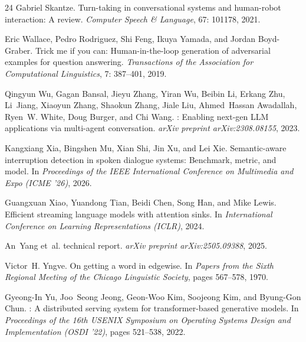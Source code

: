 \documentclass{article}
\begin{document}
\begin{thebibliography}{24}
Gabriel Skantze.
\newblock Turn-taking in conversational systems and human-robot interaction: A review.
\newblock \emph{Computer Speech \& Language}, 67: 101178, 2021.

Eric Wallace, Pedro Rodriguez, Shi Feng, Ikuya Yamada, and Jordan Boyd-Graber.
\newblock Trick me if you can: Human-in-the-loop generation of adversarial examples for question answering.
\newblock \emph{Transactions of the Association for Computational Linguistics}, 7: 387--401, 2019.

Qingyun Wu, Gagan Bansal, Jieyu Zhang, Yiran Wu, Beibin Li, Erkang Zhu, Li~Jiang, Xiaoyun Zhang, Shaokun Zhang, Jiale Liu, Ahmed~Hassan Awadallah, Ryen~W. White, Doug Burger, and Chi Wang.
: Enabling next-gen {LLM} applications via multi-agent conversation.
\newblock \emph{arXiv preprint arXiv:2308.08155}, 2023.

Kangxiang Xia, Bingshen Mu, Xian Shi, Jin Xu, and Lei Xie.
\newblock Semantic-aware interruption detection in spoken dialogue systems: Benchmark, metric, and model.
\newblock In \emph{Proceedings of the IEEE International Conference on Multimedia and Expo (ICME '26)}, 2026.

Guangxuan Xiao, Yuandong Tian, Beidi Chen, Song Han, and Mike Lewis.
\newblock Efficient streaming language models with attention sinks.
\newblock In \emph{International Conference on Learning Representations (ICLR)}, 2024.

An~Yang et~al.
 technical report.
\newblock \emph{arXiv preprint arXiv:2505.09388}, 2025.

Victor~H. Yngve.
\newblock On getting a word in edgewise.
\newblock In \emph{Papers from the Sixth Regional Meeting of the Chicago Linguistic Society}, pages 567--578, 1970.

Gyeong-In Yu, Joo~Seong Jeong, Geon-Woo Kim, Soojeong Kim, and Byung-Gon Chun.
: A distributed serving system for transformer-based generative models.
\newblock In \emph{Proceedings of the 16th USENIX Symposium on Operating Systems Design and Implementation (OSDI '22)}, pages 521--538, 2022.


\end{thebibliography}
\end{document}

